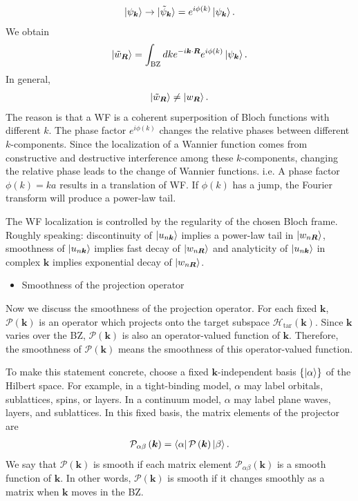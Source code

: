 \documentclass[12pt, oneside]{article}
\newcommand{\mr}[1]{\mathrm{#1}}
\newcommand{\p}[1]{\left(#1\right)}
\newcommand{\br}[1]{\left\{#1\right\}}
\numberwithin{equation}{subsection}
\begin{document}
\begin{align}
	\ket{\psi_{\bm{k}} } \rightarrow \ket{\tilde{\psi}_{\bm{k}} } = e^{i \phi \p{k}}  \ket{\psi_{\bm{k}}}.
\end{align}
We obtain
\begin{align}
	\ket{\tilde{w}_{\bm{R}}} = \int_{\mr{BZ}} dk e^{-i \bm{k} \cdot \bm{R}} e^{i \phi\p{k}} \ket{\psi_{\bm{k}}}.
\end{align}
In general,
\begin{align}
	\ket{\tilde{w}_{\bm{R}}} \neq \ket{w_{\bm{R}}}.
\end{align}
The reason is that a WF is a coherent superposition of Bloch functions with different \(k\). The phase factor \(e^{i \phi\p{k}}\) changes the relative phases between different \(k\)-components. Since the localization of a Wannier function comes from constructive and destructive interference among these \(k\)-components, changing the relative phase leads to the change of Wannier functions.  i.e. A phase factor \(\phi\p{k} = ka\) results in a translation of WF. If \(\phi \p{k}\) has a jump, the Fourier transform will produce a power-law tail. 

The WF localization is controlled by the regularity of the chosen Bloch frame. Roughly speaking: discontinuity of \(\ket{u_{n \bm{k}}}\) implies a power-law tail in \(\ket{w_{n \bm{R}}}\), smoothness of \(\ket{u_{n \bm{k}}}\) implies fast decay of \(\ket{w_{n \bm{R}}}\) and analyticity of \(\ket{u_{n \bm{k}}}\)  in complex \(\bm{k}\) implies exponential decay of \(\ket{w_{n \bm{R}}}\).

\begin{itemize}
	\item Smoothness of the projection operator
\end{itemize}

Now we discuss the smoothness of the projection operator. For each fixed \(\bm{k}\), \(\mathcal{P}\p{\bm{k}}\) is an operator which projects onto the target subspace \(\mathcal{H}_{\mr{tar}}\p{\bm{k}}\). Since \(\bm{k}\) varies over the BZ, \(\mathcal{P}\p{\bm{k}}\) is also an operator-valued function of \(\bm{k}\). Therefore, the smoothness of \(\mathcal{P}\p{\bm{k}}\) means the smoothness of this operator-valued function.

To make this statement concrete, choose a fixed \(\bm{k}\)-independent basis \(\br{\ket{\alpha}}\) of the Hilbert space. For example, in a tight-binding model, \(\alpha\) may label orbitals, sublattices, spins, or layers. In a continuum model, \(\alpha\) may label plane waves, layers, and sublattices. In this fixed basis, the matrix elements of the projector are
\begin{align}
	\mathcal{P}_{\alpha\beta}\p{\bm{k}}=\bra{\alpha}\mathcal{P}\p{\bm{k}}\ket{\beta}.
\end{align}
We say that \(\mathcal{P}\p{\bm{k}}\) is smooth if each matrix element \(\mathcal{P}_{\alpha\beta}\p{\bm{k}}\) is a smooth function of \(\bm{k}\). In other words, \(\mathcal{P}\p{\bm{k}}\) is smooth if it changes smoothly as a matrix when \(\bm{k}\) moves in the BZ.
\end{document}
